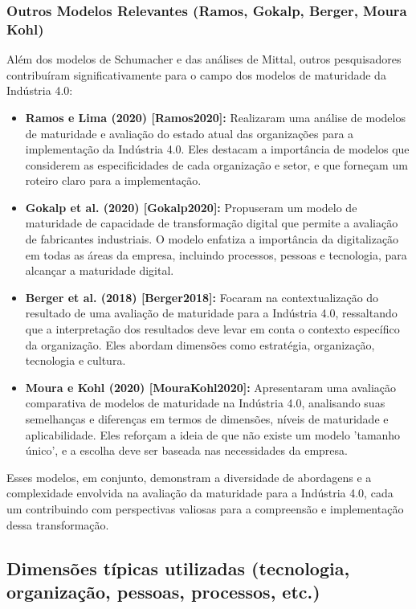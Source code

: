 \subsubsection{Outros Modelos Relevantes (Ramos, Gokalp, Berger, Moura Kohl)}

Além dos modelos de Schumacher e das análises de Mittal, outros pesquisadores contribuíram significativamente para o campo dos modelos de maturidade da Indústria 4.0:
\begin{itemize}
    \item \textbf{Ramos e Lima (2020) [Ramos2020]:} Realizaram uma análise de modelos de maturidade e avaliação do estado atual das organizações para a implementação da Indústria 4.0. Eles destacam a importância de modelos que considerem as especificidades de cada organização e setor, e que forneçam um roteiro claro para a implementação.
    \item \textbf{Gokalp et al. (2020) [Gokalp2020]:} Propuseram um modelo de maturidade de capacidade de transformação digital que permite a avaliação de fabricantes industriais. O modelo enfatiza a importância da digitalização em todas as áreas da empresa, incluindo processos, pessoas e tecnologia, para alcançar a maturidade digital.
    \item \textbf{Berger et al. (2018) [Berger2018]:} Focaram na contextualização do resultado de uma avaliação de maturidade para a Indústria 4.0, ressaltando que a interpretação dos resultados deve levar em conta o contexto específico da organização. Eles abordam dimensões como estratégia, organização, tecnologia e cultura.
    \item \textbf{Moura e Kohl (2020) [MouraKohl2020]:} Apresentaram uma avaliação comparativa de modelos de maturidade na Indústria 4.0, analisando suas semelhanças e diferenças em termos de dimensões, níveis de maturidade e aplicabilidade. Eles reforçam a ideia de que não existe um modelo 'tamanho único', e a escolha deve ser baseada nas necessidades da empresa.
\end{itemize}

Esses modelos, em conjunto, demonstram a diversidade de abordagens e a complexidade envolvida na avaliação da maturidade para a Indústria 4.0, cada um contribuindo com perspectivas valiosas para a compreensão e implementação dessa transformação.

\subsection{Dimensões típicas utilizadas (tecnologia, organização, pessoas, processos, etc.)}

